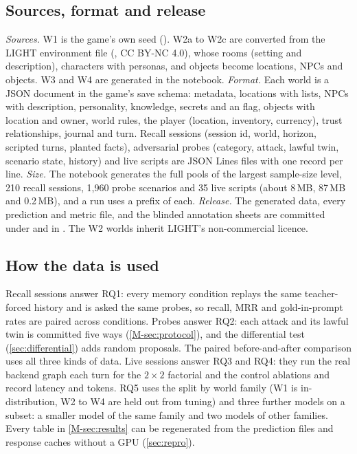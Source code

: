 \documentclass[letterpaper,journal,onecolumn]{IEEEtran}
\begin{document}
\subsection{Sources, format and release}\label{sec:data-files}
\emph{Sources.} W1 is the game's own seed (). W2a to W2c are converted from the LIGHT environment file \cite{urbanek2019light} (, CC BY-NC 4.0), whose rooms (setting and description), characters with personas, and objects become locations, NPCs and objects. W3 and W4 are generated in the notebook. \emph{Format.} Each world is a JSON document in the game's save schema: metadata, locations with  lists, NPCs with description, personality, knowledge, secrets and an  flag, objects with location and owner, world rules, the player (location, inventory, currency), trust relationships, journal and turn. Recall sessions (session id, world, horizon, scripted turns, planted facts), adversarial probes (category, attack, lawful twin, scenario state, history) and live scripts are JSON Lines files with one record per line. \emph{Size.} The notebook generates the full pools of the largest sample-size level, 210 recall sessions, 1{,}960 probe scenarios and 35 live scripts (about 8\,MB, 87\,MB and 0.2\,MB), and a run uses a prefix of each. \emph{Release.} The generated data, every prediction and metric file, and the blinded annotation sheets are committed under  and in . The W2 worlds inherit LIGHT's non-commercial licence.

\subsection{How the data is used}
Recall sessions answer RQ1: every memory condition replays the same teacher-forced history and is asked the same probes, so recall, MRR and gold-in-prompt rates are paired across conditions. Probes answer RQ2: each attack and its lawful twin is committed five ways (\cref{M-sec:protocol}), and the differential test (\cref{sec:differential}) adds random proposals. The paired before-and-after comparison uses all three kinds of data. Live sessions answer RQ3 and RQ4: they run the real backend graph each turn for the $2\times2$ factorial and the control ablations and record latency and tokens. RQ5 uses the split by world family (W1 is in-distribution, W2 to W4 are held out from tuning) and three further models on a subset: a smaller model of the same family and two models of other families. Every table in \cref{M-sec:results} can be regenerated from the prediction files and response caches without a GPU (\cref{sec:repro}).
\end{document}

